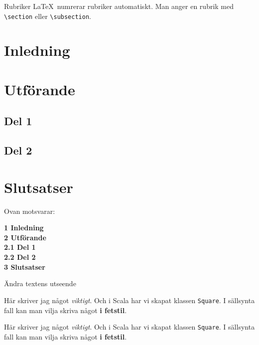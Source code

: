 \begin{Slide}{Rubriker}
  \LaTeX\ numrerar rubriker automatiskt. Man anger en rubrik med
  \verb+\section+ eller \verb+\subsection+.

  \blankline
  \begin{exlatex}
\section{Inledning}
\section{Utförande}
\subsection{Del 1}
\subsection{Del 2}
\section{Slutsatser}
  \end{exlatex}

  Ovan motsvarar:

  \begin{exlatex}
{\Large\bfseries 1 Inledning} \\[1ex]
{\Large\bfseries 2 Utförande} \\[1ex]
{\large\bfseries 2.1 Del 1} \\[1ex]
{\large\bfseries 2.2 Del 2} \\[1ex]
{\Large\bfseries 3 Slutsatser}
  \end{exlatex}

\end{Slide}

\begin{Slide}{Ändra textens utseende}

  \begin{itemize}
  \end{itemize}

  \blankline
  
  \begin{exlatex}
Här skriver jag något \emph{viktigt}.
Och i Scala har vi skapat klassen \texttt{Square}.
I sällsynta fall kan man vilja skriva något \textbf{i fetstil}.
  \end{exlatex}
Här skriver jag något \emph{viktigt}.
Och i Scala har vi skapat klassen \texttt{Square}.
I sällsynta fall kan man vilja skriva något \textbf{i fetstil}.
  
  \blankline
\end{Slide}


